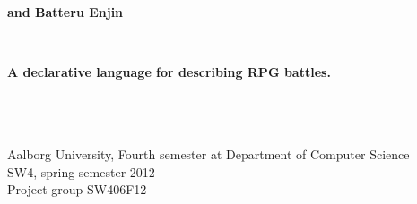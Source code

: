 \thispagestyle{empty}
\begin{center}
	\hrulefill\newline
	\\
	\begin{LARGE}	
	\textbf{\langname{} and Batteru Enjin}
	\end{LARGE}
	\\
	\begin{large} 
	\textbf{A declarative language for describing RPG battles.}
	\end{large}\\
	\hrulefill\newline
	\\~\\
	Aalborg University, Fourth semester at Department of Computer Science \\
	SW4, spring semester 2012	\\
	Project group SW406F12\\
\end{center}
